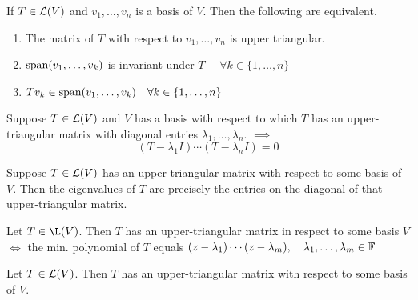 \setcounter{thm}{38}
\begin{thm}
    \label{conditions for upper-triangular matrix}
    If $T \in \mathcal{L} (V)$ and $v_1, \dots, v_n$ is a basis of $V$. Then the following are equivalent.
    \begin{enumerate}[label=(\alph*)]
        
        \item The matrix of $T$ with respect to $v_1, \dots, v_n$ is upper triangular.
        \item $\operatorname{span} (v_1, \dots, v_k)$ is invariant under $T$ $\quad \forall k \in \{ 1, \dots, n\}$
        \item $T v_k \in \operatorname{span} (v_1, \dots, v_k) \quad \forall k \in \{1, \dots, n\}$
    \end{enumerate}
\end{thm}

\begin{thm}
    \label{equation-satisfied-by-operator-with-upper-triangular-matrix}
    Suppose $T\in \mathcal{L}(V)$ and $V$ has a basis with respect to which $T$ has an upper-triangular matrix with diagonal entries $\lambda_1, \dots, \lambda_n$. $\implies$
    \begin{equation}
        (T-\lambda_1I) \cdots (T-\lambda_nI)=0
    \end{equation}
\end{thm}

\begin{thm}
    \label{determination-of-eigenvalue-from-upper-triangular-matrix}
    Suppose $T\in \mathcal{L}(V)$ has an upper-triangular matrix with respect to some basis of $V$. Then the eigenvalues of $T$ are precisely the entries on the diagonal of that upper-triangular matrix.
\end{thm}

\begin{thm}
    \label{necessary and sufficient condition to have an upper-triangular-matrix}
    Let $T\in \L(V)$. Then $T$ has an upper-triangular matrix in respect to some basis $V$ $\iff$ the min. polynomial of $T$ equals $(z-\lambda_1) \cdots (z-\lambda_m), \quad \lambda_1, \dots, \lambda_m \in \mathbb{F}$ 
\end{thm}

\begin{thm}
    \label{If-F-equals-C-every-operator-on-V-has-an-upper-triangular-matrix}
    Let $T\in \mathcal{L} (V)$. Then $T$ has an upper-triangular matrix with respect to some basis of $V$.
\end{thm}

